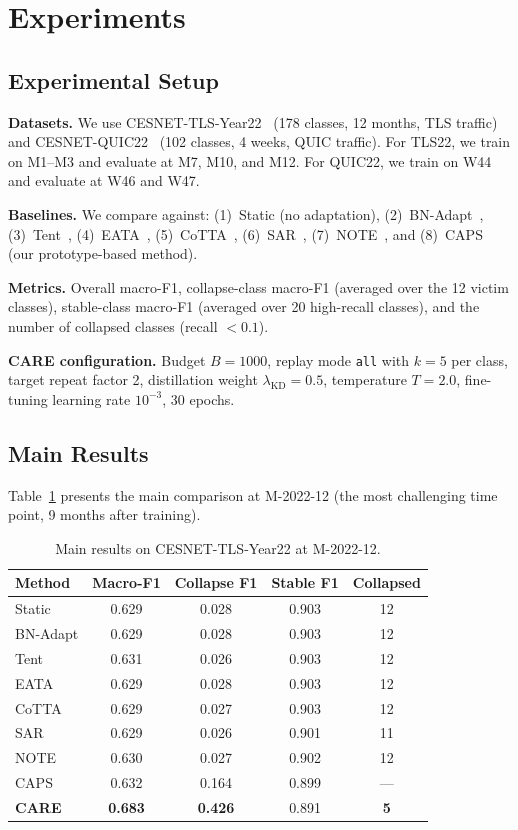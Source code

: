 \documentclass[journal]{IEEEtran}
\newcommand{\ours}{CARE}  %
\begin{document}
\section{Experiments}
\label{sec:experiments}

\subsection{Experimental Setup}

\textbf{Datasets.}
We use CESNET-TLS-Year22~\cite{hynek2024cesnet} (178 classes, 12 months, TLS traffic) and CESNET-QUIC22~\cite{luxemburk2023quic} (102 classes, 4 weeks, QUIC traffic).
For TLS22, we train on M1--M3 and evaluate at M7, M10, and M12.
For QUIC22, we train on W44 and evaluate at W46 and W47.

\textbf{Baselines.}
We compare against: (1)~Static (no adaptation), (2)~BN-Adapt~\cite{schneider2020bn}, (3)~Tent~\cite{wang2021tent}, (4)~EATA~\cite{niu2022eata}, (5)~CoTTA~\cite{wang2022cotta}, (6)~SAR~\cite{niu2023sar}, (7)~NOTE~\cite{gong2022note}, and (8)~CAPS (our prototype-based method).

\textbf{Metrics.}
Overall macro-F1, collapse-class macro-F1 (averaged over the 12 victim classes), stable-class macro-F1 (averaged over 20 high-recall classes), and the number of collapsed classes (recall $< 0.1$).

\textbf{\ours{} configuration.}
Budget $B=1000$, replay mode \texttt{all} with $k=5$ per class, target repeat factor 2, distillation weight $\lambda_{\text{KD}}=0.5$, temperature $T=2.0$, fine-tuning learning rate $10^{-3}$, 30 epochs.

\subsection{Main Results}

Table~\ref{tab:main_results} presents the main comparison at M-2022-12 (the most challenging time point, 9 months after training).

\begin{table}[t]
\centering
\caption{Main results on CESNET-TLS-Year22 at M-2022-12.}
\label{tab:main_results}
\small
\begin{tabular}{@{}l cccc@{}}
\toprule
Method & Macro-F1 & Collapse F1 & Stable F1 & Collapsed \\
\midrule
Static      & 0.629 & 0.028 & 0.903 & 12 \\
BN-Adapt    & 0.629 & 0.028 & 0.903 & 12 \\
Tent        & 0.631 & 0.026 & 0.903 & 12 \\
EATA        & 0.629 & 0.028 & 0.903 & 12 \\
CoTTA       & 0.629 & 0.027 & 0.903 & 12 \\
SAR         & 0.629 & 0.026 & 0.901 & 11 \\
NOTE        & 0.630 & 0.027 & 0.902 & 12 \\
CAPS        & 0.632 & 0.164 & 0.899 & --- \\
\midrule
\textbf{\ours{}} & \textbf{0.683} & \textbf{0.426} & 0.891 & \textbf{5} \\
\bottomrule
\end{tabular}
\end{table}
\end{document}
